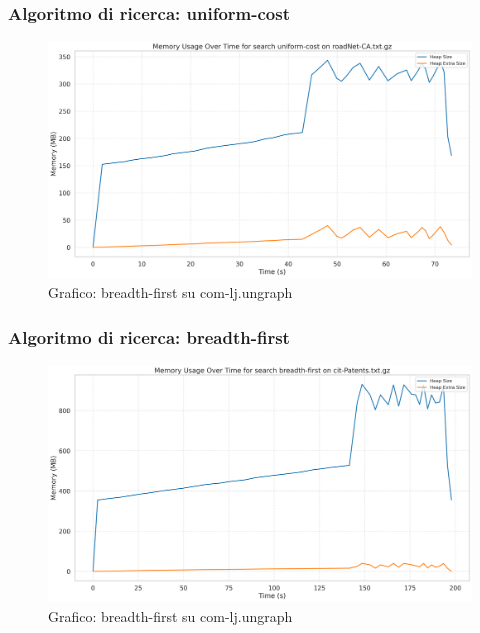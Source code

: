 \documentclass{article}
\begin{document}
\subsubsection{Algoritmo di ricerca: uniform-cost}
\begin{figure}[h]\centering
\includegraphics[width=\textwidth]{../plots/roadNet-CA_uniform-cost.png}
\caption{Grafico: breadth-first su com-lj.ungraph}
\end{figure}
\subsubsection{Algoritmo di ricerca: breadth-first}
\begin{figure}[h]\centering
\includegraphics[width=\textwidth]{../plots/cit-Patents_breadth-first.png}
\caption{Grafico: breadth-first su com-lj.ungraph}
\end{figure}
\end{document}
